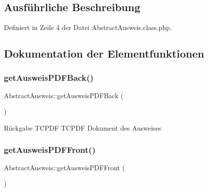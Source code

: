 \subsection{Ausführliche Beschreibung}


Definiert in Zeile 4 der Datei Abstract\+Ausweis.\+class.\+php.



\subsection{Dokumentation der Elementfunktionen}
\mbox{\label{class_abstract_ausweis_abc559bd235762d0234c25dcea44a8730}} 
\subsubsection{\texorpdfstring{get\+Ausweis\+P\+D\+F\+Back()}{getAusweisPDFBack()}}
{\footnotesize\ttfamily Abstract\+Ausweis\+::get\+Ausweis\+P\+D\+F\+Back (\begin{DoxyParamCaption}{ }\end{DoxyParamCaption})\hspace{0.3cm}{\ttfamily [abstract]}}

\begin{DoxyReturn}{Rückgabe}
T\+C\+P\+DF T\+C\+P\+DF Dokument des Ausweises 
\end{DoxyReturn}
\mbox{\label{class_abstract_ausweis_a7c65e02f1291567ab17484537a8fb2fe}} 
\subsubsection{\texorpdfstring{get\+Ausweis\+P\+D\+F\+Front()}{getAusweisPDFFront()}}
{\footnotesize\ttfamily Abstract\+Ausweis\+::get\+Ausweis\+P\+D\+F\+Front (\begin{DoxyParamCaption}{ }\end{DoxyParamCaption})\hspace{0.3cm}{\ttfamily [abstract]}}

